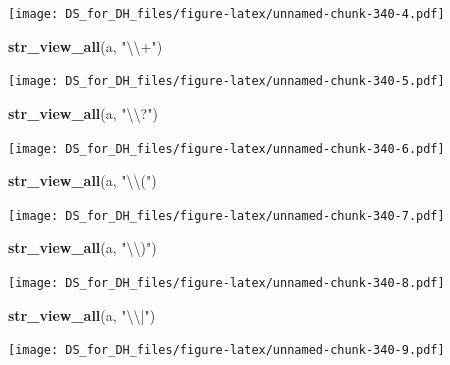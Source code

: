 \documentclass[
]{book}
\newenvironment{Shaded}{\begin{snugshade}}{\end{snugshade}}
\newcommand{\CharTok}[1]{\textcolor[rgb]{0.31,0.60,0.02}{#1}}
\newcommand{\KeywordTok}[1]{\textcolor[rgb]{0.13,0.29,0.53}{\textbf{#1}}}
\newcommand{\NormalTok}[1]{#1}
\newcommand{\StringTok}[1]{\textcolor[rgb]{0.31,0.60,0.02}{#1}}
\begin{document}
\texttt{[image: DS\_for\_DH\_files/figure-latex/unnamed-chunk-340-4.pdf]}

\begin{Shaded}
\begin{Highlighting}[]
\KeywordTok{str_view_all}\NormalTok{(a, }\StringTok{"}\CharTok{\textbackslash{}\textbackslash{}}\StringTok{+"}\NormalTok{)}
\end{Highlighting}
\end{Shaded}

\texttt{[image: DS\_for\_DH\_files/figure-latex/unnamed-chunk-340-5.pdf]}

\begin{Shaded}
\begin{Highlighting}[]
\KeywordTok{str_view_all}\NormalTok{(a, }\StringTok{"}\CharTok{\textbackslash{}\textbackslash{}}\StringTok{?"}\NormalTok{)}
\end{Highlighting}
\end{Shaded}

\texttt{[image: DS\_for\_DH\_files/figure-latex/unnamed-chunk-340-6.pdf]}

\begin{Shaded}
\begin{Highlighting}[]
\KeywordTok{str_view_all}\NormalTok{(a, }\StringTok{"}\CharTok{\textbackslash{}\textbackslash{}}\StringTok{("}\NormalTok{)}
\end{Highlighting}
\end{Shaded}

\texttt{[image: DS\_for\_DH\_files/figure-latex/unnamed-chunk-340-7.pdf]}

\begin{Shaded}
\begin{Highlighting}[]
\KeywordTok{str_view_all}\NormalTok{(a, }\StringTok{"}\CharTok{\textbackslash{}\textbackslash{}}\StringTok{)"}\NormalTok{)}
\end{Highlighting}
\end{Shaded}

\texttt{[image: DS\_for\_DH\_files/figure-latex/unnamed-chunk-340-8.pdf]}

\begin{Shaded}
\begin{Highlighting}[]
\KeywordTok{str_view_all}\NormalTok{(a, }\StringTok{"}\CharTok{\textbackslash{}\textbackslash{}}\StringTok{|"}\NormalTok{)}
\end{Highlighting}
\end{Shaded}

\texttt{[image: DS\_for\_DH\_files/figure-latex/unnamed-chunk-340-9.pdf]}
\end{document}
